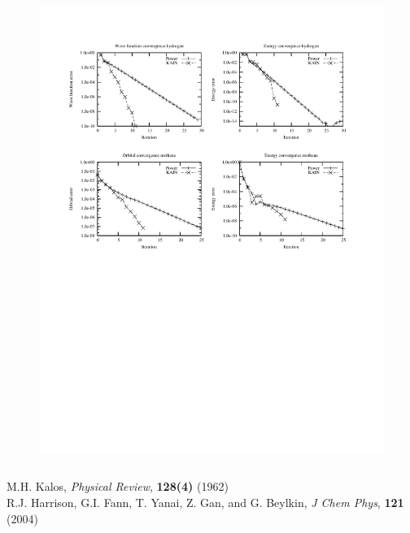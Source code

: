 \begin{frame}
\begin{columns}
\begin{column}[b]{0.55\textwidth}
    \begin{figure}
        \includegraphics[scale=0.6, clip, viewport = 50 350 300 540]
        {figures/convergence.pdf}
    \end{figure}

    \end{column}
    \end{columns}
    \centering
    \vspace{2mm}
    \tiny
    M.H. Kalos, 
    {\it Physical Review}, 
    \textbf{128(4)}
    (1962)\\
    R.J. Harrison, G.I. Fann, T. Yanai, Z. Gan, and G. Beylkin, 
    {\it J Chem Phys}, 
    \textbf{121}
    (2004)
\end{frame}




